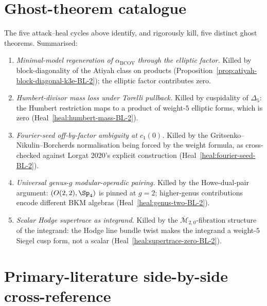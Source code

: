 \documentclass[11pt]{article}
\providecommand{\BCOV}{\mathrm{BCOV}}
\providecommand{\Mbar}{\overline{\mathcal M}}
\begin{document}
\section{Ghost-theorem catalogue}
\label{sec:ghost-catalogue}

The five attack--heal cycles above identify, and rigorously kill, five
distinct ghost theorems. Summarised:

\begin{enumerate}[label=\textbf{G\arabic*.}]
\item \emph{Minimal-model regeneration of $\alpha_\BCOV$ through the
elliptic factor.} Killed by block-diagonality of the Atiyah class on
products (Proposition~\ref{prop:atiyah-block-diagonal-k3e-BL-2});
the elliptic factor contributes zero.
\item \emph{Humbert-divisor mass loss under Torelli pullback.} Killed
by cuspidality of $\Delta_5$: the Humbert restriction maps to a product
of weight-$5$ elliptic forms, which is zero
(Heal~\ref{heal:humbert-mass-BL-2}).
\item \emph{Fourier-seed off-by-factor ambiguity at $c_1(0)$.} Killed
by the Gritsenko--Nikulin--Borcherds normalisation being forced by the
weight formula, as cross-checked against Lorgat 2020's explicit
construction (Heal~\ref{heal:fourier-seed-BL-2}).
\item \emph{Universal genus-$g$ modular-operadic pairing.} Killed by
the Howe-dual-pair argument: $(O(2, 2), \Sp_4)$ is pinned at $g = 2$;
higher-genus contributions encode different BKM algebras
(Heal~\ref{heal:genus-two-BL-2}).
\item \emph{Scalar Hodge supertrace as integrand.} Killed by the
$\Mbar_{2, 0}$-fibration structure of the integrand: the Hodge line
bundle twist makes the integrand a weight-$5$ Siegel cusp form, not a
scalar (Heal~\ref{heal:supertrace-zero-BL-2}).
\end{enumerate}

\section{Primary-literature side-by-side cross-reference}
\label{sec:primary-lit-cross-ref}
\end{document}
